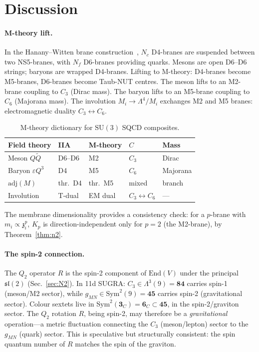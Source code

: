 \documentclass[12pt,a4paper]{article}
\newcommand{\SU}{\mathrm{SU}}
\newcommand{\Nf}{N_{\!f}}
\newcommand{\Nc}{N_{\!c}}
\newcommand{\adj}{\mathrm{adj}}
\newcommand{\zch}{\mathfrak{z}}
\begin{document}
\section{Discussion}
\label{sec:discussion}

\paragraph{M-theory lift.}
In the Hanany--Witten brane
construction~\cite{HananyWitten:1997}, $\Nc$ D4-branes are
suspended between two NS5-branes, with $\Nf$ D6-branes providing
quarks.
Mesons are open D6--D6 strings; baryons are wrapped D4-branes.
Lifting to M-theory: D4-branes become M5-branes, D6-branes
become Taub-NUT centres.
The meson lifts to an M2-brane coupling to $C_3$ (Dirac mass).
The baryon lifts to an M5-brane coupling to $C_6$ (Majorana mass).
The involution $M_i \to \Lambda^4/M_i$ exchanges M2 and M5
branes: electromagnetic duality $C_3 \leftrightarrow C_6$.

\begin{table}[ht]
\centering\small
\caption{M-theory dictionary for $\SU(3)$ SQCD composites.}
\label{tab:Mtheory}
\begin{tabular}{lllll}
\hline
Field theory & IIA & M-theory & $C$ & Mass \\
\hline
Meson $Q\tilde{Q}$ & D6--D6 & M2 & $C_3$ & Dirac \\
Baryon $\varepsilon Q^3$ & D4 & M5 & $C_6$ & Majorana \\
$\adj(M)$ & thr.\ D4 & thr.\ M5 & mixed & branch \\
Involution & T-dual & EM dual & $C_3{\leftrightarrow}C_6$ & --- \\
\hline
\end{tabular}
\end{table}

The membrane dimensionality provides a consistency check: for a
$p$-brane with $m_i \propto \zch_i^p$,
$K_p$ is direction-independent only for $p = 2$ (the M2-brane),
by Theorem~\ref{thm:n2}.

\paragraph{The spin-2 connection.}
The $Q_2$ operator $R$ is the spin-2 component of $\mathrm{End}(V)$
under the principal $\mathfrak{sl}(2)$
(Sec.~\ref{sec:N2}).
In 11d SUGRA: $C_3 \in \Lambda^3(9) = \mathbf{84}$ carries
spin-1 (meson/M2 sector), while
$g_{MN} \in \mathrm{Sym}^2(9) = \mathbf{45}$ carries spin-2
(gravitational sector).
Colour sextets live in
$\mathrm{Sym}^2(\mathbf{3}_C) = \mathbf{6}_C \subset \mathbf{45}$,
in the spin-2/graviton sector.
The $Q_2$ rotation $R$, being spin-2, may therefore be a
\emph{gravitational} operation---a metric fluctuation connecting
the $C_3$ (meson/lepton) sector to the $g_{MN}$ (quark) sector.
This is speculative but structurally consistent: the spin quantum
number of $R$ matches the spin of the graviton.
\end{document}

